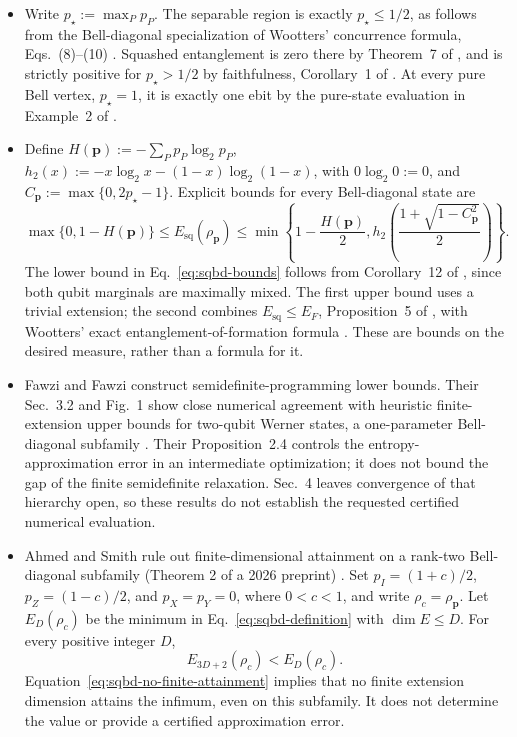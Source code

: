 \begin{itemize}
  \item Write $p_\star:=\max_Pp_P$.  The separable region is exactly
$p_\star\leq1/2$, as follows from the Bell-diagonal specialization of
Wootters' concurrence formula, Eqs.~(8)--(10)
.  Squashed entanglement is zero there
by Theorem~7 of , and is
strictly positive for $p_\star>1/2$ by faithfulness, Corollary~1 of
.  At every pure Bell
vertex, $p_\star=1$, it is exactly one ebit by the pure-state evaluation
in Example~2 of .

  \item Define $H(\mathbf p):=-\sum_Pp_P\log_2p_P$,
$h_2(x):=-x\log_2x-(1-x)\log_2(1-x)$, with $0\log_2 0:=0$, and
$C_{\mathbf p}:=\max\{0,2p_\star-1\}$.  Explicit bounds for every Bell-diagonal state are
\begin{equation}
  \max\{0,1-H(\mathbf p)\}
  \leq E_{\mathrm{sq}}(\rho_{\mathbf p})
  \leq\min\!\left\{
    1-\frac{H(\mathbf p)}2,
    h_2\!\left(\frac{1+\sqrt{1-C_{\mathbf p}^2}}2\right)
  \right\}.
  \label{eq:sqbd-bounds}
\end{equation}
The lower bound in Eq.~\eqref{eq:sqbd-bounds} follows from Corollary~12 of
, since both qubit marginals
are maximally mixed.  The first upper bound uses a trivial extension;
the second combines $E_{\mathrm{sq}}\leq E_F$, Proposition~5 of
, with Wootters' exact
entanglement-of-formation formula .
These are bounds on the desired measure, rather than a formula for it.

  \item Fawzi and Fawzi construct semidefinite-programming lower bounds.
Their Sec.~3.2 and Fig.~1 show close numerical agreement with heuristic
finite-extension upper bounds for two-qubit Werner states, a
one-parameter Bell-diagonal subfamily
.  Their Proposition~2.4 controls
the entropy-approximation error in an intermediate optimization; it does
not bound the gap of the finite semidefinite relaxation.  Sec.~4 leaves
convergence of that hierarchy open, so these results do not establish the
requested certified numerical evaluation.

  \item Ahmed and Smith rule out finite-dimensional attainment on a rank-two
Bell-diagonal subfamily (Theorem 2 of a 2026 preprint)
.  Set
$p_I=(1+c)/2$, $p_Z=(1-c)/2$, and $p_X=p_Y=0$, where $0<c<1$, and
write $\rho_c=\rho_{\mathbf p}$.  Let $E_D(\rho_c)$ be the minimum in
Eq.~\eqref{eq:sqbd-definition} with $\dim E\leq D$.  For every positive
integer $D$,
\begin{equation}
  E_{3D+2}(\rho_c)<E_D(\rho_c).
  \label{eq:sqbd-no-finite-attainment}
\end{equation}
Equation~\eqref{eq:sqbd-no-finite-attainment} implies that no finite
extension dimension attains the infimum, even on this subfamily.  It does
not determine the value or provide a certified approximation error.


\end{itemize}
